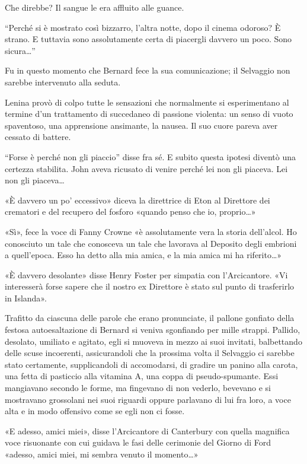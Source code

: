\documentclass[
a5paper, %
10pt, %
twoside, 
onecolumn, %
openany, %
]{memoir}
\begin{document}
Che direbbe? Il sangue le era affluito alle guance.

“Perché si è mostrato così bizzarro, l’altra notte, dopo il cinema odoroso? È strano. E tuttavia sono assolutamente certa di piacergli davvero un poco. Sono sicura…”

Fu in questo momento che Bernard fece la sua comunicazione; il Selvaggio non sarebbe intervenuto alla seduta.

Lenina provò di colpo tutte le sensazioni che normalmente si esperimentano al termine d’un trattamento di succedaneo di passione violenta: un senso di vuoto spaventoso, una apprensione ansimante, la nausea. Il suo cuore pareva aver cessato di battere.

“Forse è perché non gli piaccio” disse fra sé. E subito questa ipotesi diventò una certezza stabilita. John aveva ricusato di venire perché lei non gli piaceva. Lei non gli piaceva…

«È davvero un po’ eccessivo» diceva la direttrice di Eton al Direttore dei crematori e del recupero del fosforo «quando penso che io, proprio…»

«Sì», fece la voce di Fanny Crowne «è assolutamente vera la storia dell’alcol. Ho conosciuto un tale che conosceva un tale che lavorava al Deposito degli embrioni a quell’epoca. Esso ha detto alla mia amica, e la mia amica mi ha riferito…»

«È davvero desolante» disse Henry Foster per simpatia con l’Arcicantore. «Vi interesserà forse sapere che il nostro ex Direttore è stato sul punto di trasferirlo in Islanda».

Trafitto da ciascuna delle parole che erano pronunciate, il pallone gonfiato della festosa autoesaltazione di Bernard si veniva sgonfiando per mille strappi. Pallido, desolato, umiliato e agitato, egli si muoveva in mezzo ai suoi invitati, balbettando delle scuse incoerenti, assicurandoli che la prossima volta il Selvaggio ci sarebbe stato certamente, supplicandoli di accomodarsi, di gradire un panino alla carota, una fetta di pasticcio alla vitamina A, una coppa di pseudo-spumante. Essi mangiavano secondo le forme, ma fingevano di non vederlo, bevevano e si mostravano grossolani nei suoi riguardi oppure parlavano di lui fra loro, a voce alta e in modo offensivo come se egli non ci fosse.

«E adesso, amici miei», disse l’Arcicantore di Canterbury con quella magnifica voce risuonante con cui guidava le fasi delle cerimonie del Giorno di Ford «adesso, amici miei, mi sembra venuto il momento…»
\end{document}
